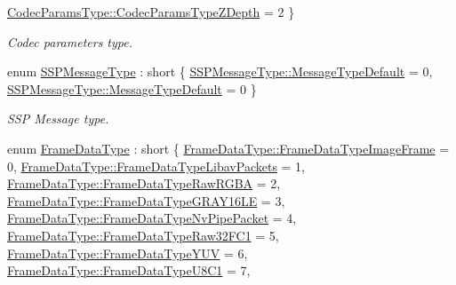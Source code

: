 \begin{DoxyCompactItemize}
\hyperlink{namespacemoetsi_1_1ssp_a6d638ba0bd38e9daded08f633d893563a4e738f8ec62ed2fd5d5675f71b291992}{Codec\+Params\+Type\+::\+Codec\+Params\+Type\+Z\+Depth} = 2
 \}\begin{DoxyCompactList}\small\item\em Codec parameters type. \end{DoxyCompactList}
\item 
enum \hyperlink{namespacemoetsi_1_1ssp_a8948545ffe48a5b3507fd10a1e56d546}{S\+S\+P\+Message\+Type} \+: short \{ \hyperlink{namespacemoetsi_1_1ssp_a8948545ffe48a5b3507fd10a1e56d546a16d065ca1ae16532bc3115ec68734080}{S\+S\+P\+Message\+Type\+::\+Message\+Type\+Default} = 0, 
\hyperlink{namespacemoetsi_1_1ssp_a8948545ffe48a5b3507fd10a1e56d546a16d065ca1ae16532bc3115ec68734080}{S\+S\+P\+Message\+Type\+::\+Message\+Type\+Default} = 0
 \}\begin{DoxyCompactList}\small\item\em S\+SP Message type. \end{DoxyCompactList}
\item 
enum \hyperlink{namespacemoetsi_1_1ssp_aa9b059f0bc7a91855545ee887f2d56c4}{Frame\+Data\+Type} \+: short \{ \newline
\hyperlink{namespacemoetsi_1_1ssp_aa9b059f0bc7a91855545ee887f2d56c4a6f466822a5d24eab84554c0bf415903d}{Frame\+Data\+Type\+::\+Frame\+Data\+Type\+Image\+Frame} = 0, 
\hyperlink{namespacemoetsi_1_1ssp_aa9b059f0bc7a91855545ee887f2d56c4a234b11a09d69865a40eb4db132fe7096}{Frame\+Data\+Type\+::\+Frame\+Data\+Type\+Libav\+Packets} = 1, 
\hyperlink{namespacemoetsi_1_1ssp_aa9b059f0bc7a91855545ee887f2d56c4ac2cdf85544553bda5453b401b79964eb}{Frame\+Data\+Type\+::\+Frame\+Data\+Type\+Raw\+R\+G\+BA} = 2, 
\hyperlink{namespacemoetsi_1_1ssp_aa9b059f0bc7a91855545ee887f2d56c4a44d909233498ad3dec5a3e3e95e908ca}{Frame\+Data\+Type\+::\+Frame\+Data\+Type\+G\+R\+A\+Y16\+LE} = 3, 
\newline
\hyperlink{namespacemoetsi_1_1ssp_aa9b059f0bc7a91855545ee887f2d56c4a1628ff13722acd71d3e90b51c8faa31c}{Frame\+Data\+Type\+::\+Frame\+Data\+Type\+Nv\+Pipe\+Packet} = 4, 
\hyperlink{namespacemoetsi_1_1ssp_aa9b059f0bc7a91855545ee887f2d56c4abb6735708adc6efcecf59e0e1e6c9387}{Frame\+Data\+Type\+::\+Frame\+Data\+Type\+Raw32\+F\+C1} = 5, 
\hyperlink{namespacemoetsi_1_1ssp_aa9b059f0bc7a91855545ee887f2d56c4a6191c61c70f47aa00e2f9251d8ad59fa}{Frame\+Data\+Type\+::\+Frame\+Data\+Type\+Y\+UV} = 6, 
\hyperlink{namespacemoetsi_1_1ssp_aa9b059f0bc7a91855545ee887f2d56c4acd5fc2d48d13ef44a9806046ae34d56b}{Frame\+Data\+Type\+::\+Frame\+Data\+Type\+U8\+C1} = 7, 

\end{DoxyCompactItemize}
